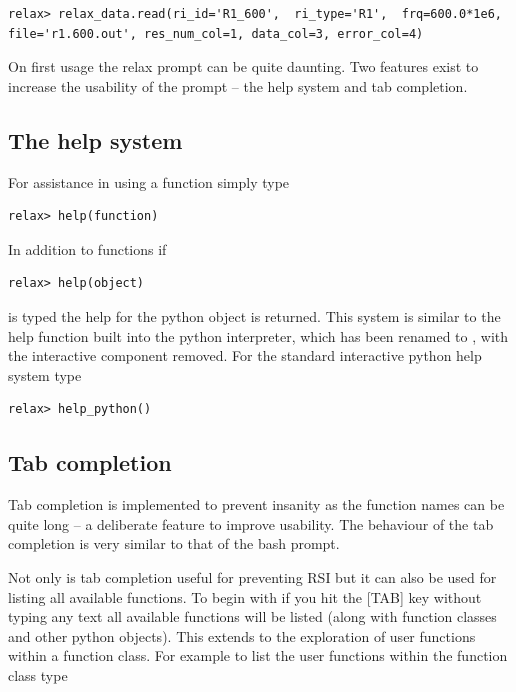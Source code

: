 \begin{lstlisting}[numbers=none]
relax> relax_data.read(ri_id='R1_600',  ri_type='R1',  frq=600.0*1e6, file='r1.600.out', res_num_col=1, data_col=3, error_col=4)
\end{lstlisting}

On first usage the relax prompt can be quite daunting.  Two features exist to increase the usability of the prompt -- the help system and tab completion.




\subsection{The help system}

For assistance in using a function simply type

\begin{lstlisting}[numbers=none]
relax> help(function)
\end{lstlisting}

In addition to functions if

\begin{lstlisting}[numbers=none]
relax> help(object)
\end{lstlisting}

is typed the help for the python object is returned.  This system is similar to the help function built into the python interpreter, which has been renamed to , with the interactive component removed.  For the standard interactive python help system type

\begin{lstlisting}[numbers=none]
relax> help_python()
\end{lstlisting}





\subsection{Tab completion}

Tab completion is implemented to prevent insanity as the function names can be quite long -- a deliberate feature to improve usability.  The behaviour of the tab completion is very similar to that of the bash prompt.

Not only is tab completion useful for preventing RSI but it can also be used for listing all available functions.  To begin with if you hit the [TAB] key without typing any text all available functions will be listed (along with function classes and other python objects).  This extends to the exploration of user functions within a function class.  For example to list the user functions within the function class  type

